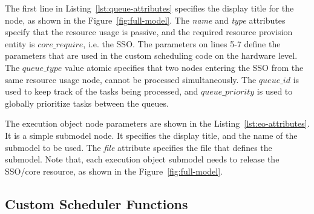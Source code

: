 

The first line in Listing~\ref{lst:queue-attributes} specifies the display title for the node, as shown in the Figure~\ref{fig:full-model}. The \emph{name} and \emph{type} attributes specify that the resource usage is passive, and the required resource provision entity is $core\_require$, i.e. the SSO. The parameters on lines 5-7 define the parameters that are used in the custom scheduling code on the hardware level. The \emph{$queue\_type$} value atomic specifies that two nodes entering the SSO from the same resource usage node, cannot be processed simultaneously. The \emph{$queue\_id$} is used to keep track of the tasks being processed, and \emph{$queue\_priority$} is used to globally prioritize tasks between the queues.



The execution object node parameters are shown in the Listing~\ref{lst:eo-attributes}. It is a simple submodel node. It specifies the display title, and the name of the submodel to be used. The \emph{file} attribute specifies the file that defines the submodel. Note that, each execution object submodel needs to release the SSO/core resource, as shown in the Figure~\ref{fig:full-model}.

\subsection{Custom Scheduler Functions}
\label{sec:custom-scheduler-functions}



